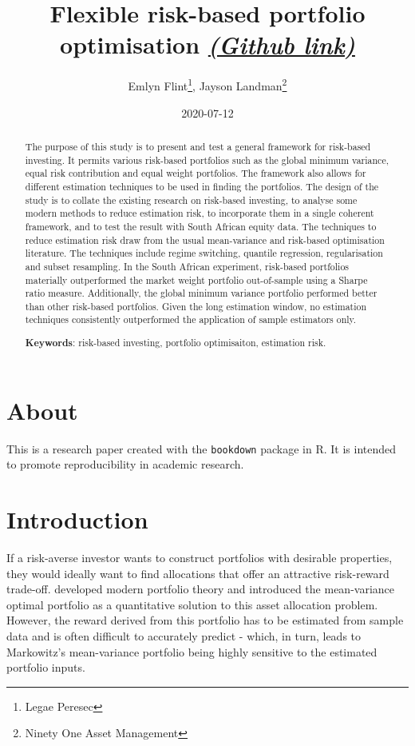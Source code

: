 \documentclass[
]{article}
\title{Flexible risk-based portfolio optimisation
\href{https://github.com/jhlandman/flex_rb_opt}{\emph{(Github link)}}}
\author{Emlyn Flint\footnote{Legae Peresec}, Jayson Landman\footnote{Ninety One Asset Management}}
\date{2020-07-12}
\begin{document}
\maketitle
\begin{abstract}
The purpose of this study is to present and test a general framework for risk-based investing. It permits various risk-based portfolios such as the global minimum variance, equal risk contribution and equal weight portfolios. The framework also allows for different estimation techniques to be used in finding the portfolios. The design of the study is to collate the existing research on risk-based investing, to analyse some modern methods to reduce estimation risk, to incorporate them in a single coherent framework, and to test the result with South African equity data. The techniques to reduce estimation risk draw from the usual mean-variance and risk-based optimisation literature. The techniques include regime switching, quantile regression, regularisation and subset resampling. In the South African experiment, risk-based portfolios materially outperformed the market weight portfolio out-of-sample using a Sharpe ratio measure. Additionally, the global minimum variance portfolio performed better than other risk-based portfolios. Given the long estimation window, no estimation techniques consistently outperformed the application of sample estimators only.

\textbf{Keywords}: risk-based investing, portfolio optimisaiton, estimation risk.
\end{abstract}

{
\setcounter{tocdepth}{2}
\tableofcontents
}
\hypertarget{about}{%
\section{About}\label{about}}

This is a research paper created with the \texttt{bookdown} package in R. It is intended to promote
reproducibility in academic research.

\hypertarget{introduction}{%
\section{Introduction}\label{introduction}}

If a risk-averse investor wants to construct portfolios with desirable properties, they would
ideally want to find allocations that offer an attractive risk-reward trade-off. \citet{M52} developed
modern portfolio theory and introduced the mean-variance optimal portfolio as a quantitative
solution to this asset allocation problem. However, the reward derived from this portfolio has to be
estimated from sample data and is often difficult to accurately predict - which, in turn, leads to
Markowitz's mean-variance portfolio being highly sensitive to the estimated portfolio inputs.
\end{document}
